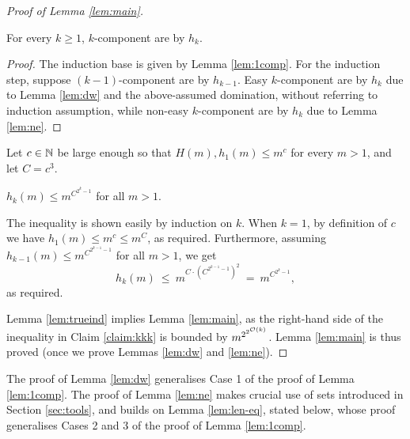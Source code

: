 \begin{proof}[Proof of Lemma \ref{lem:main}]
\begin{lemma} \label{lem:trueind}
For every $k\geq 1$, 
$k$-component \tvass are \lb by $h_k$.
\end{lemma}
%
\begin{proof}
The induction base is given by Lemma \ref{lem:1comp}.
For the induction step, suppose $(k-1)$-component \tvass are \lb by $h_{k-1}$.
Easy $k$-component \tvass are \lb by $h_k$ due to Lemma \ref{lem:dw} and the above-assumed domination, 
without referring to induction assumption,
while non-easy $k$-component \tvass are \lb by $h_k$ due to Lemma \ref{lem:ne}.
\end{proof}
%
%
Let $c\in\mathbb{N}$ be large enough so that $H(m), h_1(m) \leq m^{c}$ for every $m>1$,
and let $C=c^3$.
%
\begin{claim} \label{claim:kkk}
$h_{k}(m) \leq {m}^{C^{2^{k} -1}}$ for all $m > 1$.
\end{claim}
%
\begin{appendixproof}
The inequality is shown easily by induction on $k$.
When $k=1$, by definition of $c$ we have $h_1(m) \leq m^c\leq m^C$, as required.
Furthermore, assuming
$h_{k-1}(m) \leq {m}^{C^{2^{k-1} -1}}$ for all $m>1$, we get
\[
h_k(m) \ \leq \ {m}^{C\cdot (C^{2^{k-1} -1})^2} 
\ = \ m^{C^{2^k-1}},
\]
as required.
\end{appendixproof}
%
Lemma \ref{lem:trueind} implies Lemma \ref{lem:main}, 
as the right-hand side of the inequality in Claim \ref{claim:kkk} is bounded by ${m}^{2^{2^{{\cal O}(k)}}}$.
Lemma \ref{lem:main} is thus proved (once we prove Lemmas \ref{lem:dw} and \ref{lem:ne}).
\end{proof}

The proof of Lemma \ref{lem:dw} generalises Case 1 of the proof of Lemma \ref{lem:1comp}.
The proof of Lemma \ref{lem:ne} makes crucial use of \sandwich sets introduced
in Section \ref{sec:tools}, and builds on 
Lemma \ref{lem:len-eq}, stated below, whose proof 
generalises Cases 2 and 3 of the proof of Lemma \ref{lem:1comp}.


